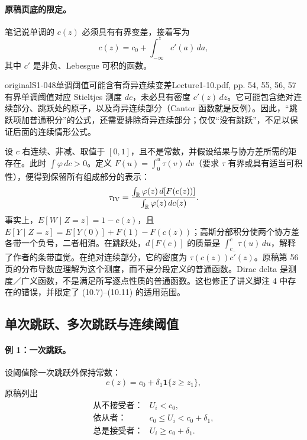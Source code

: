 \paragraph{原稿页底的限定。}
笔记说单调的 $c(z)$ 必须具有有界变差，接着写为
\[
 c(z)=c_0+\int_{-\infty}^zc'(a)\,da,
\]
其中 $c'$ 是非负、Lebesgue 可积的函数。
\begin{reviewnote}{original}{S1-048}{单调阈值可能含有奇异连续变差}{Lecture1-10.pdf, pp. 54, 55, 56, 57}
有界单调阈值对应 Stieltjes 测度 $dc$，未必具有密度 $c'(z)\,dz$。它可能包含绝对连续部分、跳跃处的原子，以及奇异连续部分（Cantor 函数就是反例）。因此，“跳跃项加普通积分”的公式，还需要排除奇异连续部分；仅仅“没有跳跃”，不足以保证后面的连续情形公式。

设 $c$ 右连续、非减、取值于 $[0,1]$，且不是常数，并假设结果与协方差所需的矩存在。此时 $\int\varphi\,dc>0$。定义 $F(u)=\int_0^u\tau(v)\,dv$（要求 $\tau$ 有界或具有适当可积性），便得到保留所有组成部分的表示：
\[
\tau_{\rm IV}=\frac{\int_{\mathbb R}\varphi(z)\,d[F(c(z))]}{\int_{\mathbb R}\varphi(z)\,dc(z)}.
\]
事实上，$E[W\mid Z=z]=1-c(z)$，且 $E[Y\mid Z=z]=E[Y(0)]+F(1)-F(c(z))$；高斯分部积分使两个协方差各带一个负号，二者相消。在跳跃处，$d[F(c)]$ 的质量是 $\int_{c_-}^{c}\tau(u)\,du$，解释了作者的条带直觉。在绝对连续部分，它的密度为 $\tau(c(z))c'(z)$。原稿第 56 页的分布导数应理解为这个测度，而不是分段定义的普通函数。Dirac delta 是测度／广义函数，不是满足所写逐点性质的普通函数。这也修正了讲义脚注 4 中存在的错误，并限定了 (10.7)--(10.11) 的适用范围。
\end{reviewnote}



\clearpage
\subsection{单次跳跃、多次跳跃与连续阈值}
\paragraph{例 1：一次跳跃。}
设阈值除一次跳跃外保持常数：
\[
 c(z)=c_0+\delta_1\mathbf1\{z\ge z_1\},
\]
原稿列出
\[
 \begin{array}{ll}
 \text{从不接受者：}&U_i<c_0,\\
 \text{依从者：}&c_0\le U_i<c_0+\delta_1,\\
 \text{总是接受者：}&U_i\ge c_0+\delta_1.
 \end{array}
\]


